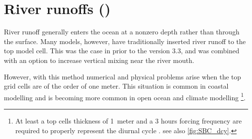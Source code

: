 \documentclass[../tex_main/NEMO_manual]{subfiles}
\begin{document}
\section{River runoffs (\protect{})}
\label{sec:SBC_rnf}






River runoff generally enters the ocean at a nonzero depth rather than through the surface.
Many models, however, have traditionally inserted river runoff to the top model cell.
This was the case in \NEMO prior to the version 3.3,
and was combined with an option to increase vertical mixing near the river mouth.

However, with this method numerical and physical problems arise when the top grid cells are of the order of one meter.
This situation is common in coastal modelling and is becoming more common in open ocean and climate modelling 
\footnote{
  At least a top cells thickness of 1~meter and a 3 hours forcing frequency are required to
  properly represent the diurnal cycle \citep{Bernie_al_JC05}.
  see also \autoref{fig:SBC_dcy}.}.
\end{document}
